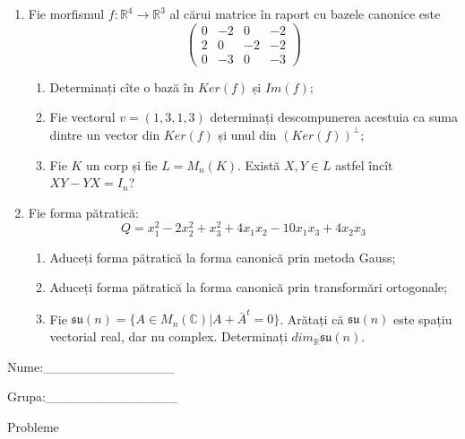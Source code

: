 \documentclass{article}
\begin{document}
\begin{enumerate}
 \item Fie morfismul $f:\mathbb{R}^4 \to \mathbb{R}^3$ al cărui matrice în raport cu bazele canonice este
$$\begin{pmatrix}
0&-2&0&-2\\
2&0&-2&-2\\
0&-3&0&-3
\end{pmatrix}$$

\begin{enumerate}
\item Determinați cîte o bază în $Ker(f)$ și $Im(f)$;
\item Fie vectorul $v=(1,3,1,3)$ determinați descompunerea acestuia ca suma dintre un vector din $Ker(f)$ și unul din $(Ker(f))^\perp$;
\item Fie $K$ un corp și fie $L=M_n(K)$. Există $X,Y \in L$ astfel încît $XY-YX=I_n$?  
\end{enumerate}
\item Fie forma pătratică:
$$Q= x_1^2-2x_2^2+x_3^2+4x_1x_2-10x_1x_3+4x_2x_3$$

\begin{enumerate}
\item Aduceți forma pătratică la forma canonică prin metoda Gauss;
\item Aduceți forma pătratică la forma canonică prin transformări ortogonale;
\item Fie $\mathfrak{su}(n)=\{ A \in M_n(\mathbb{C}) | A+\bar{A}^t=0\}$. Arătați că $\mathfrak{su}(n)$ este spațiu vectorial real, dar nu complex.
Determinați $dim_{\mathbb{R}}\mathfrak{su}(n)$.
\end{enumerate}
\end{enumerate}
\newpage
\begin{flushright}
Nume:\_\_\_\_\_\_\_\_\_\_\_\_\_\_
 
 
Grupa:\_\_\_\_\_\_\_\_\_\_\_\_\_\_
\end{flushright}
\begin{center}
\vspace{2cm}
{\Large Probleme}
\vspace{2cm}
\end{center}
\end{document}

